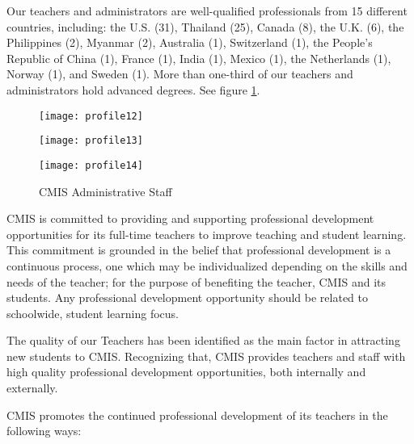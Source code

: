 
Our teachers and administrators are well-qualified professionals from 15 different countries, including:  the U.S. (31), Thailand (25), Canada (8), the U.K. (6), the Philippines (2), Myanmar (2), Australia (1), Switzerland (1), the People’s Republic of China (1), France (1), India (1), Mexico (1), the Netherlands (1), Norway (1), and Sweden (1).  More than one-third of our teachers and administrators hold advanced degrees. See figure \ref{figure:adminstaff}.

\begin{figure}[H]
\centering
\caption{CMIS Administrative Staff}
\label{figure:adminstaff}
\begin{minipage}{0.5\textwidth}
\texttt{[image: profile12]}
\end{minipage}%
\begin{minipage}{0.5\textwidth}
\texttt{[image: profile13]}
\end{minipage}

\begin{minipage}{0.5\textwidth}
\texttt{[image: profile14]}
\end{minipage}%
\begin{minipage}{0.5\textwidth}
\hfill
\end{minipage}
\end{figure}


CMIS is committed to providing and supporting professional development opportunities for its full-time teachers to improve teaching and student learning. This commitment is grounded in the belief that professional development is a continuous process, one which may be individualized depending on the skills and needs of the teacher; for the purpose of benefiting the teacher, CMIS and its students.  Any professional development opportunity should be related to schoolwide, student learning focus. 

The quality of our Teachers has been identified as the main factor in attracting new students to CMIS.  Recognizing that, CMIS provides teachers and staff with high quality professional development opportunities, both internally and externally.  

CMIS promotes the continued professional development of its teachers in the following ways:

